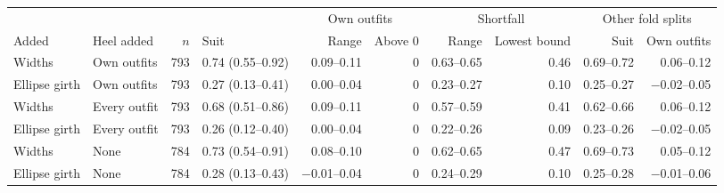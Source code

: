 \begin{tabular}{llrlrrrrrr}
\toprule
 & & & & \multicolumn{2}{c}{Own outfits} & \multicolumn{2}{c}{Shortfall} & \multicolumn{2}{c}{Other fold splits} \\
\cmidrule(lr){5-6}\cmidrule(lr){7-8}\cmidrule(lr){9-10}
Added & Heel added & $n$ & Suit & Range & Above 0 & Range & Lowest bound & Suit & Own outfits \\
\midrule
Widths & Own outfits & 793 & 0.74 (0.55--0.92) & 0.09--0.11 & 0 & 0.63--0.65 & 0.46 & 0.69--0.72 & 0.06--0.12 \\
Ellipse girth & Own outfits & 793 & 0.27 (0.13--0.41) & 0.00--0.04 & 0 & 0.23--0.27 & 0.10 & 0.25--0.27 & $-$0.02--0.05 \\
Widths & Every outfit & 793 & 0.68 (0.51--0.86) & 0.09--0.11 & 0 & 0.57--0.59 & 0.41 & 0.62--0.66 & 0.06--0.12 \\
Ellipse girth & Every outfit & 793 & 0.26 (0.12--0.40) & 0.00--0.04 & 0 & 0.22--0.26 & 0.09 & 0.23--0.26 & $-$0.02--0.05 \\
Widths & None & 784 & 0.73 (0.54--0.91) & 0.08--0.10 & 0 & 0.62--0.65 & 0.47 & 0.69--0.73 & 0.05--0.12 \\
Ellipse girth & None & 784 & 0.28 (0.13--0.43) & $-$0.01--0.04 & 0 & 0.24--0.29 & 0.10 & 0.25--0.28 & $-$0.01--0.06 \\
\bottomrule
\end{tabular}
